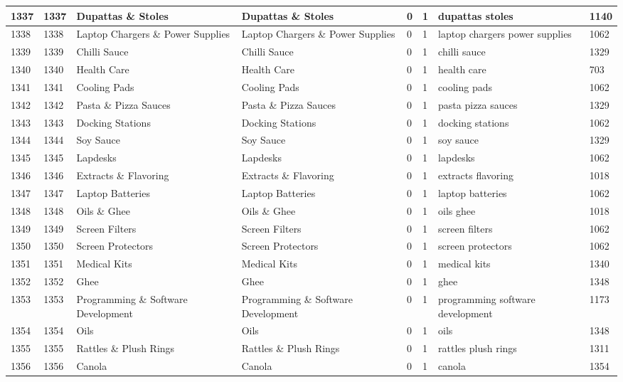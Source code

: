 \begin{longtable}{|l|l|l|l|l|l|l|l|}
1337 & 1337 & Dupattas \& Stoles & Dupattas \& Stoles & 0 & 1 & dupattas stoles & 1140 \\ \hline 
1338 & 1338 & Laptop Chargers \& Power Supplies & Laptop Chargers \& Power Supplies & 0 & 1 & laptop chargers power supplies & 1062 \\ \hline 
1339 & 1339 & Chilli Sauce & Chilli Sauce & 0 & 1 & chilli sauce & 1329 \\ \hline 
1340 & 1340 & Health Care & Health Care & 0 & 1 & health care & 703 \\ \hline 
1341 & 1341 & Cooling Pads & Cooling Pads & 0 & 1 & cooling pads & 1062 \\ \hline 
1342 & 1342 & Pasta \& Pizza Sauces & Pasta \& Pizza Sauces & 0 & 1 & pasta pizza sauces & 1329 \\ \hline 
1343 & 1343 & Docking Stations & Docking Stations & 0 & 1 & docking stations & 1062 \\ \hline 
1344 & 1344 & Soy Sauce & Soy Sauce & 0 & 1 & soy sauce & 1329 \\ \hline 
1345 & 1345 & Lapdesks & Lapdesks & 0 & 1 & lapdesks & 1062 \\ \hline 
1346 & 1346 & Extracts \& Flavoring & Extracts \& Flavoring & 0 & 1 & extracts flavoring & 1018 \\ \hline 
1347 & 1347 & Laptop Batteries & Laptop Batteries & 0 & 1 & laptop batteries & 1062 \\ \hline 
1348 & 1348 & Oils \& Ghee & Oils \& Ghee & 0 & 1 & oils ghee & 1018 \\ \hline 
1349 & 1349 & Screen Filters & Screen Filters & 0 & 1 & screen filters & 1062 \\ \hline 
1350 & 1350 & Screen Protectors & Screen Protectors & 0 & 1 & screen protectors & 1062 \\ \hline 
1351 & 1351 & Medical Kits & Medical Kits & 0 & 1 & medical kits & 1340 \\ \hline 
1352 & 1352 & Ghee & Ghee & 0 & 1 & ghee & 1348 \\ \hline 
1353 & 1353 & Programming \& Software Development & Programming \& Software Development & 0 & 1 & programming software development & 1173 \\ \hline 
1354 & 1354 & Oils & Oils & 0 & 1 & oils & 1348 \\ \hline 
1355 & 1355 & Rattles \& Plush Rings & Rattles \& Plush Rings & 0 & 1 & rattles plush rings & 1311 \\ \hline 
1356 & 1356 & Canola & Canola & 0 & 1 & canola & 1354 \\ \hline 

\end{longtable}
